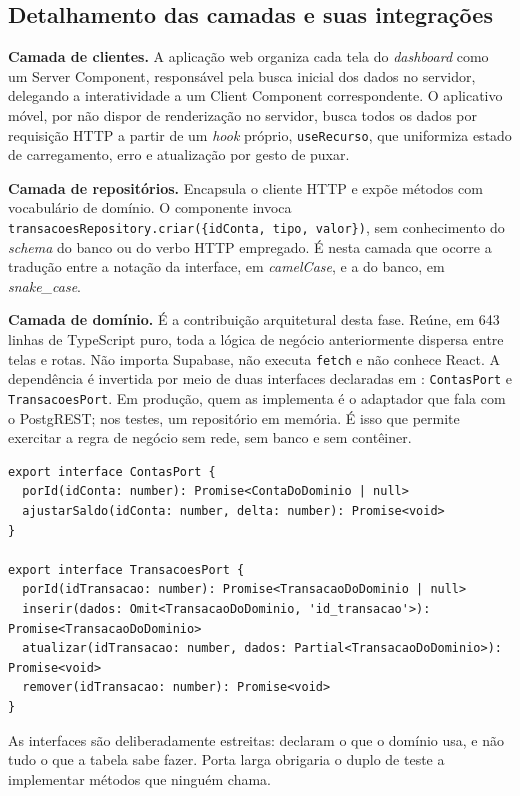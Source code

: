\documentclass[12pt,a4paper]{article}
\begin{document}
\subsection{Detalhamento das camadas e suas integrações}

\textbf{Camada de clientes.} A aplicação web organiza cada tela do \textit{dashboard} como um Server Component, responsável pela busca inicial dos dados no servidor, delegando a interatividade a um Client Component correspondente. O aplicativo móvel, por não dispor de renderização no servidor, busca todos os dados por requisição HTTP a partir de um \textit{hook} próprio, \texttt{useRecurso}, que uniformiza estado de carregamento, erro e atualização por gesto de puxar.

\textbf{Camada de repositórios.} Encapsula o cliente HTTP e expõe métodos com vocabulário de domínio. O componente invoca \texttt{transacoesRepository.criar(\{idConta, tipo, valor\})}, sem conhecimento do \textit{schema} do banco ou do verbo HTTP empregado. É nesta camada que ocorre a tradução entre a notação da interface, em \textit{camelCase}, e a do banco, em \textit{snake\_case}.

\textbf{Camada de domínio.} É a contribuição arquitetural desta fase. Reúne, em 643 linhas de TypeScript puro, toda a lógica de negócio anteriormente dispersa entre telas e rotas. Não importa Supabase, não executa \texttt{fetch} e não conhece React. A dependência é invertida por meio de duas interfaces declaradas em : \texttt{ContasPort} e \texttt{TransacoesPort}. Em produção, quem as implementa é o adaptador que fala com o PostgREST; nos testes, um repositório em memória. É isso que permite exercitar a regra de negócio sem rede, sem banco e sem contêiner.

\begin{lstlisting}[caption={Portas do domínio: a dependência apontando para dentro.}]
export interface ContasPort {
  porId(idConta: number): Promise<ContaDoDominio | null>
  ajustarSaldo(idConta: number, delta: number): Promise<void>
}

export interface TransacoesPort {
  porId(idTransacao: number): Promise<TransacaoDoDominio | null>
  inserir(dados: Omit<TransacaoDoDominio, 'id_transacao'>): Promise<TransacaoDoDominio>
  atualizar(idTransacao: number, dados: Partial<TransacaoDoDominio>): Promise<void>
  remover(idTransacao: number): Promise<void>
}
\end{lstlisting}

As interfaces são deliberadamente estreitas: declaram o que o domínio usa, e não tudo o que a tabela sabe fazer. Porta larga obrigaria o duplo de teste a implementar métodos que ninguém chama.
\end{document}

